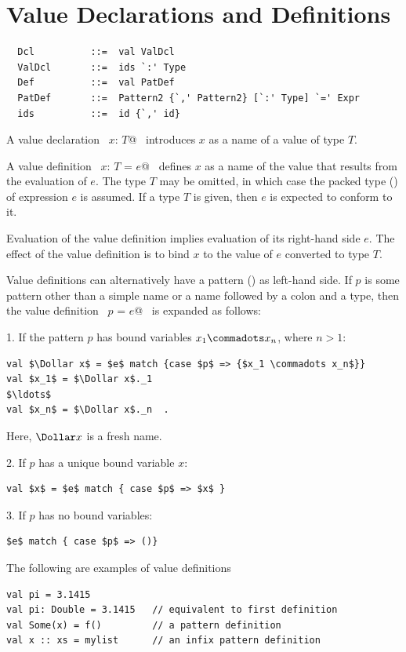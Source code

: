\section{Value Declarations and Definitions}
\label{sec:valdef}

\syntax\begin{lstlisting}
  Dcl          ::=  val ValDcl
  ValDcl       ::=  ids `:' Type
  Def          ::=  val PatDef 
  PatDef       ::=  Pattern2 {`,' Pattern2} [`:' Type] `=' Expr
  ids          ::=  id {`,' id}
\end{lstlisting}

A value declaration ~\lstinline@val $x$: $T$@~ introduces $x$ as a name of a value of
type $T$.  

A value definition ~\lstinline@val $x$: $T$ = $e$@~ defines $x$ as a
name of the value that results from the evaluation of $e$. The type
$T$ may be omitted, in which case the packed type () of expression $e$ is
assumed.  If a type $T$ is given, then $e$ is expected to conform to
it.

Evaluation of the value definition implies evaluation of its
right-hand side $e$.  The effect of the value definition is to bind
$x$ to the value of $e$ converted to type $T$.

Value definitions can alternatively have a pattern
() as left-hand side.  If $p$ is some pattern other
than a simple name or a name followed by a colon and a type, then the
value definition ~\lstinline@val $p$ = $e$@~ is expanded as follows:

1. If the pattern $p$ has bound variables $x_1 \commadots x_n$, where $n > 1$:
\begin{lstlisting}
val $\Dollar x$ = $e$ match {case $p$ => {$x_1 \commadots x_n$}}
val $x_1$ = $\Dollar x$._1
$\ldots$
val $x_n$ = $\Dollar x$._n  .
\end{lstlisting}
Here, $\Dollar x$ is a fresh name.  

2. If $p$ has a unique bound variable $x$:
\begin{lstlisting}
val $x$ = $e$ match { case $p$ => $x$ }
\end{lstlisting}

3. If $p$ has no bound variables:
\begin{lstlisting}
$e$ match { case $p$ => ()}
\end{lstlisting}

\example
The following are examples of value definitions
\begin{lstlisting}
val pi = 3.1415 
val pi: Double = 3.1415   // equivalent to first definition
val Some(x) = f()         // a pattern definition
val x :: xs = mylist      // an infix pattern definition
\end{lstlisting}

